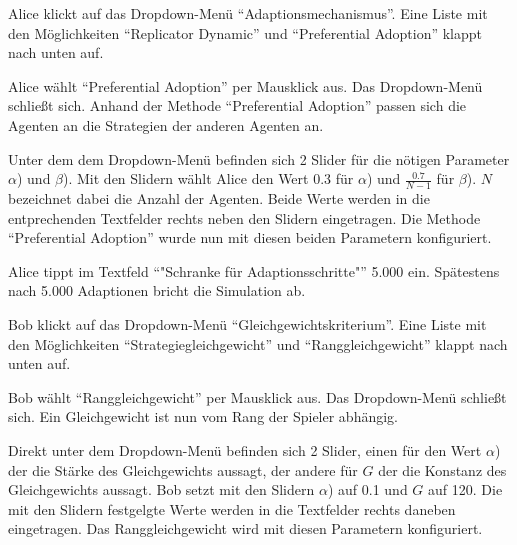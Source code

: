 \documentclass[parskip=full,11pt]{scrartcl}
\begin{document}

{Alice klickt auf das Dropdown-Menü \enquote{Adaptionsmechanismus}.}
{Eine Liste mit den Möglichkeiten \enquote{Replicator Dynamic} und  \enquote{Preferential Adoption} klappt nach unten auf.}

{Alice wählt \enquote{Preferential Adoption} per Mausklick aus.}
{Das Dropdown-Menü schließt sich. Anhand der Methode  \enquote{Preferential Adoption} passen sich die Agenten an die Strategien der anderen Agenten an.}

{Unter dem dem Dropdown-Menü befinden sich 2 Slider für die nötigen Parameter \(\alpha\)) und \(\beta\)). Mit den Slidern wählt Alice den Wert 0.3 für \(\alpha\)) und \(\frac{0.7}{N - 1}\) für  \(\beta\)). \(N\) bezeichnet dabei die Anzahl der Agenten.}
{Beide Werte werden in die entprechenden Textfelder rechts neben den Slidern eingetragen. Die Methode \enquote{Preferential Adoption} wurde nun mit diesen beiden Parametern konfiguriert.}

{Alice tippt im Textfeld \enquote{"Schranke für Adaptionsschritte"} 5.000 ein.}
{Spätestens nach 5.000 Adaptionen bricht die Simulation ab.}


{Bob klickt auf das Dropdown-Menü \enquote{Gleichgewichtskriterium}.}
{Eine Liste mit den Möglichkeiten \enquote{Strategiegleichgewicht} und  \enquote{Ranggleichgewicht} klappt nach unten auf.}

{Bob wählt \enquote{Ranggleichgewicht} per Mausklick aus.}
{Das Dropdown-Menü schließt sich. Ein Gleichgewicht ist nun vom Rang der Spieler abhängig.}

{Direkt unter dem Dropdown-Menü befinden sich 2 Slider, einen für den Wert \(\alpha\)) der die Stärke des Gleichgewichts aussagt, der andere für \(G\) der die Konstanz des Gleichgewichts aussagt. Bob setzt mit den Slidern \(\alpha\)) auf 0.1 und  \(G\) auf 120.}
{Die mit den Slidern festgelgte Werte werden in die Textfelder rechts daneben eingetragen. Das Ranggleichgewicht wird mit diesen Parametern konfiguriert.}
\end{document}

